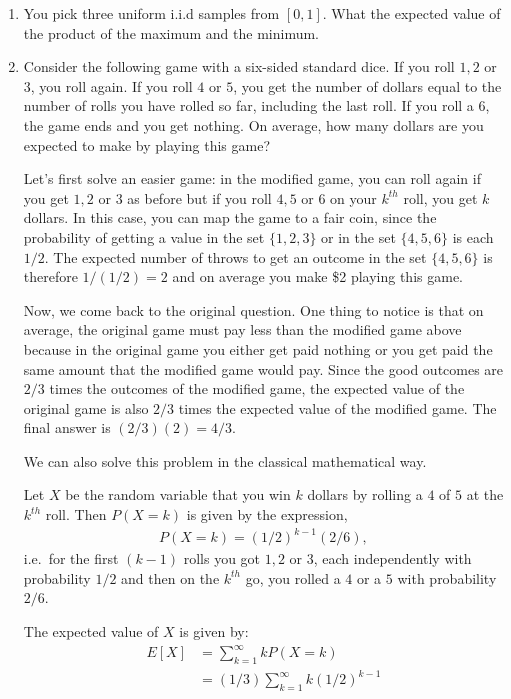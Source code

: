 \documentclass{amsart}
\theoremstyle{plain}
\numberwithin{equation}{section}
\begin{document}
\begin{enumerate}
\item You pick three uniform i.i.d samples from $[0,1]$. What the 
expected value of the product of the maximum and the minimum.

\item Consider the following game with a six-sided standard dice. 
If you roll $1,2$ or $3$, you roll again. If you 
roll $4$ or $5$, you get the number of dollars equal 
to the number of rolls you have rolled so far, including the last
roll. If you roll a $6$, the game ends and you get nothing. On 
average, how many dollars are you expected to make by 
playing this game?

Let's first solve an easier game: in the modified game, you can
roll again if you get $1, 2$ or $3$ as before but 
if you roll $4,5$ or $6$ on your $k^{th}$ roll, you get 
$k$ dollars. In this case, you can map the game to a fair 
coin, since the 
probability of getting a value in the set $\{ 1,2,3 \}$ or 
in the set $\{ 4,5,6 \}$ is each $1/2$. The expected number of 
throws to get an outcome in the set $\{4, 5, 6 \}$ is 
therefore $1/(1/2)=2$ and on average you make \$2 playing this 
game. 

Now, we come back to the original question. One thing to notice is
that on average, the original game must pay less than the modified 
game above because in the original game you either get paid nothing 
or you get paid the same amount that the modified game would pay. 
Since the good outcomes are $2/3$ times the outcomes of the 
modified game, the expected value of the original game is 
also $2/3$ times the expected value of the modified game.
The final answer is  $(2/3)(2) = 4/3$.

We can also solve this problem in the classical mathematical way.

Let $X$ be the random variable that you win $k$ dollars 
by rolling a $4$ of $5$ at the $k^{th}$ roll. Then 
$P(X=k)$ is given by the expression,
\begin{align*}
P(X=k) = (1/2)^{k-1}(2/6),
\end{align*}
i.e.\ for the first $(k-1)$ rolls you got $1,2$ or $3$, each independently 
with probability $1/2$ and then on the $k^{th}$ go, you rolled 
a $4$ or a $5$ with probability $2/6$.

The expected value of $X$ is given by:
\begin{align*}
E[X] &= \sum_{k=1}^{\infty} k P(X=k)\\
&= (1/3)\sum_{k=1}^{\infty} k (1/2)^{k-1}\\
\end{align*}


\end{enumerate}
\end{document}
